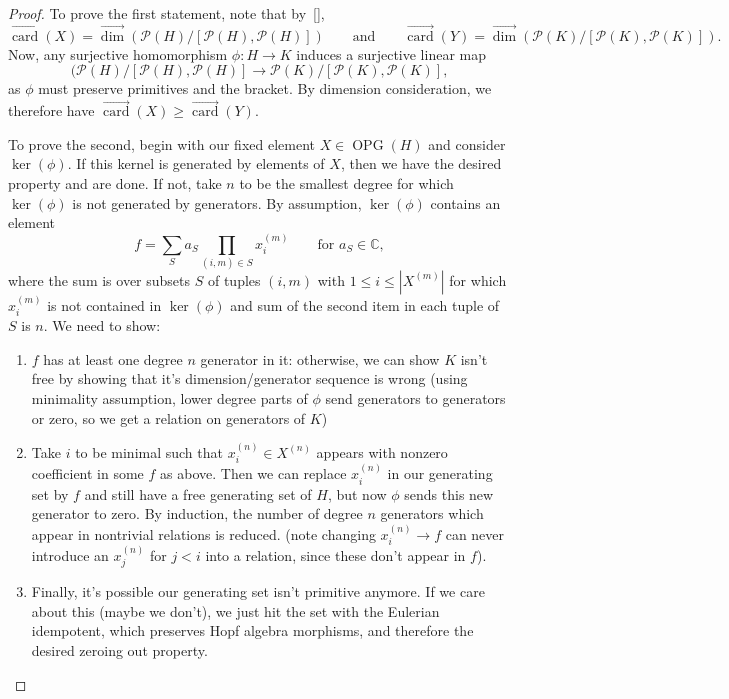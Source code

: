 \documentclass[11pt]{amsart}
\theoremstyle{definition}
\numberwithin{equation}{section}
\def\CC{{\mathbb C}}
\newcommand{\vecdim}{\overrightarrow{\dim}}
\newcommand{\veccard}{\overrightarrow{\operatorname{card}}}
\newcommand{\OPG}{\operatorname{OPG}}
\begin{document}
\begin{proof}
To prove the first statement, note that by~\ref{},
\[
\veccard(X) = \vecdim(\mathcal{P}(H) / [\mathcal{P}(H), \mathcal{P}(H)])
\qquad\text{and}\qquad
\veccard(Y) = \vecdim(\mathcal{P}(K) / [\mathcal{P}(K), \mathcal{P}(K)]).
\]
Now, any surjective homomorphism $\phi: H \to K$ induces a surjective linear map 
\[
(\mathcal{P}(H) / [\mathcal{P}(H), \mathcal{P}(H)] \to \mathcal{P}(K) / [\mathcal{P}(K), \mathcal{P}(K)],
\]
as $\phi$ must preserve primitives and the bracket.  By dimension consideration, we therefore have $\veccard(X) \ge \veccard(Y)$.

To prove the second, begin with our fixed element $X \in \OPG(H)$ and consider $\ker(\phi)$.  
If this kernel is generated by elements of $X$, then we have the desired property and are done.  
If not, take $n$ to be the smallest degree for which $\ker(\phi)$ is not generated by generators.  By assumption, $\ker(\phi)$ contains an element
\[
f = \sum_{S} a_{S} \prod_{(i, m) \in S} x_{i}^{(m)} \qquad \text{for $a_{S} \in \CC$},
\]
where the sum is over subsets $S$ of tuples $(i, m)$ with $1 \le i \le |X^{(m)}|$ for which $x_{i}^{(m)}$ is not contained in $\ker(\phi)$ and sum of the second item in each tuple of $S$ is $n$.
We need to show:
\begin{enumerate}
\item $f$ has at least one degree $n$ generator in it: otherwise, we can show $K$ isn't free by showing that it's dimension/generator sequence is wrong (using minimality assumption, lower degree parts of $\phi$ send generators to generators or zero, so we get a relation on generators of $K$)

\item Take $i$ to be minimal such that $x^{(n)}_{i} \in X^{(n)}$ appears with nonzero coefficient in some $f$ as above.  Then we can replace $x_{i}^{(n)}$ in our generating set by $f$ and still have a free generating set of $H$, but now $\phi$ sends this new generator to zero.  By induction, the number of degree $n$ generators which appear in nontrivial relations is reduced.  (note changing $x_{i}^{(n)} \to f$ can never introduce an $x_{j}^{(n)}$ for $j < i$ into a relation, since these don't appear in $f$).

\item Finally, it's possible our generating set isn't primitive anymore.  If we care about this (maybe we don't), we just hit the set with the Eulerian idempotent, which preserves Hopf algebra morphisms, and therefore the desired zeroing out property.

\end{enumerate}
\end{proof}
\end{document}
